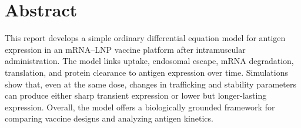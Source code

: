 \section*{Abstract}

This report develops a simple ordinary differential equation model for antigen expression in an mRNA--LNP vaccine platform after intramuscular administration. The model links uptake, endosomal escape, mRNA degradation, translation, and protein clearance to antigen expression over time. Simulations show that, even at the same dose, changes in trafficking and stability parameters can produce either sharp transient expression or lower but longer-lasting expression. Overall, the model offers a biologically grounded framework for comparing vaccine designs and analyzing antigen kinetics.

\newpage